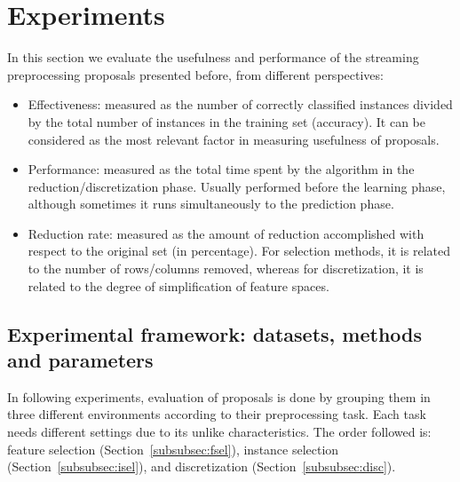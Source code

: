 \documentclass[preprint,12pt]{elsarticle}
\begin{document}

\section*{Experiments}

In this section we evaluate the usefulness and performance of the streaming preprocessing proposals presented before, from different perspectives:

\begin{itemize}
	\item Effectiveness: measured as the number of correctly classified instances divided by the total number of instances in the training set (accuracy). It can be considered as the most relevant factor in measuring usefulness of proposals.
	\item Performance: measured as the total time spent by the algorithm in the reduction/discretization phase. Usually performed before the learning phase, although sometimes it runs simultaneously to the prediction phase.
	\item Reduction rate: measured as the amount of reduction accomplished with respect to the original set (in percentage). For selection methods, it is related to the number of rows/columns removed, whereas for discretization, it is related to the degree of simplification of feature spaces.
\end{itemize} 

\subsection{Experimental framework: datasets, methods and parameters}

In following experiments, evaluation of proposals is done by grouping them in three different environments according to their preprocessing task. Each task needs different settings due to its unlike characteristics. The order followed is: feature selection (Section~\ref{subsubsec:fsel}), instance selection (Section~\ref{subsubsec:isel}), and discretization (Section~\ref{subsubsec:disc}).
\end{document}
